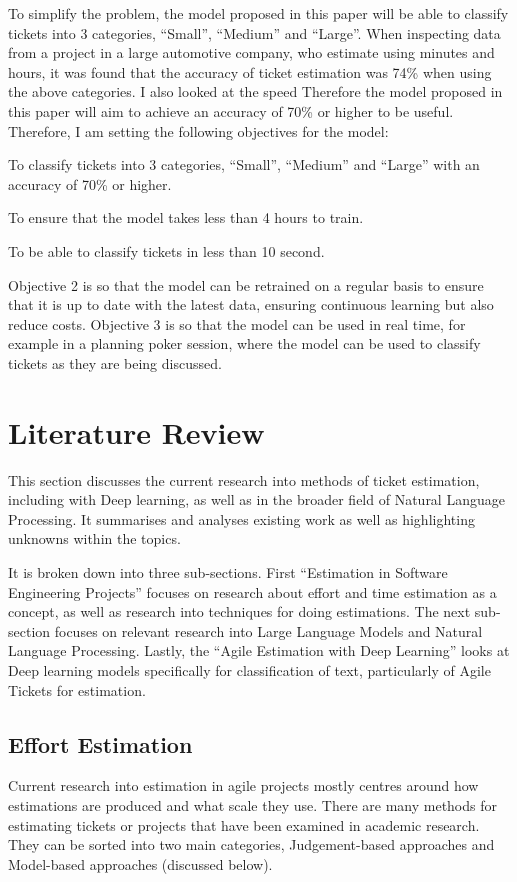 \documentclass{UoYCSproject}
\let\oldenumerate\enumerate
\let\endoldenumerate\endenumerate
\renewenvironment{enumerate}{\oldenumerate\setlength{\itemsep}{0pt}\setlength{\parskip}{0pt}\setlength{\parsep}{0pt}}{\endoldenumerate}
\begin{document}
    To simplify the problem, the model proposed in this paper will be able to classify tickets into 3 categories, “Small”, “Medium” and “Large”.
    When inspecting data from a project in a large automotive company, who estimate using minutes and hours, it was found that the accuracy of ticket estimation was 74\% when using the above categories. I also looked at the speed
    Therefore the model proposed in this paper will aim to achieve an accuracy of 70\% or higher to be useful.
    Therefore, I am setting the following objectives for the model:
    \begin{enumerate}
        \item To classify tickets into 3 categories, “Small”, “Medium” and “Large” with an accuracy of 70\% or higher.
        \item To ensure that the model takes less than 4 hours to train.
        \item To be able to classify tickets in less than 10 second.
    \end{enumerate}

    Objective 2 is so that the model can be retrained on a regular basis to ensure that it is up to date with the latest data, ensuring continuous learning but also reduce costs.
    Objective 3 is so that the model can be used in real time, for example in a planning poker session, where the model can be used to classify tickets as they are being discussed.


    \chapter{Literature Review}
    \label{ch:literature-review}
    This section discusses the current research into methods of ticket estimation, including with Deep learning, as well as in the broader field of Natural Language Processing.
    It summarises and analyses existing work as well as highlighting unknowns within the topics.

    It is broken down into three sub-sections.
    First “Estimation in Software Engineering Projects” focuses on research about effort and time estimation as a concept, as well as research into techniques for doing estimations.
    The next sub-section focuses on relevant research into Large Language Models and Natural Language Processing.
    Lastly, the “Agile Estimation with Deep Learning” looks at Deep learning models specifically for classification of text, particularly of Agile Tickets for estimation.


    \section{Effort Estimation}
    \label{sec:effort-estimation}
    Current research into estimation in agile projects mostly centres around how estimations are produced and what scale they use.
    There are many methods for estimating tickets or projects that have been examined in academic research.
    They can be sorted into two main categories, Judgement-based approaches and Model-based approaches (discussed below).
\end{document}
